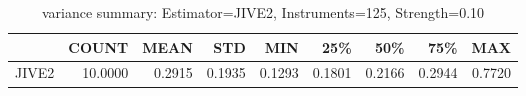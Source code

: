 \begin{table}[ht]
\centering
\caption{variance summary: Estimator=JIVE2, Instruments=125, Strength=0.10}
\begin{tabular}{lrrrrrrrr}
\toprule
 & COUNT & MEAN & STD & MIN & 25\% & 50\% & 75\% & MAX \\
\midrule
JIVE2 & 10.0000 & 0.2915 & 0.1935 & 0.1293 & 0.1801 & 0.2166 & 0.2944 & 0.7720 \\
\bottomrule
\end{tabular}
\end{table}
